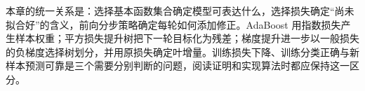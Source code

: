 本章的统一关系是：选择基本函数集合确定模型可表达什么，选择损失确定“尚未拟合好”的含义，前向分步策略确定每轮如何添加修正。AdaBoost 用指数损失产生样本权重；平方损失提升树把下一轮目标化为残差；梯度提升进一步以一般损失的负梯度选择树划分，并用原损失确定叶增量。训练损失下降、训练分类正确与新样本预测可靠是三个需要分别判断的问题，阅读证明和实现算法时都应保持这一区分。





